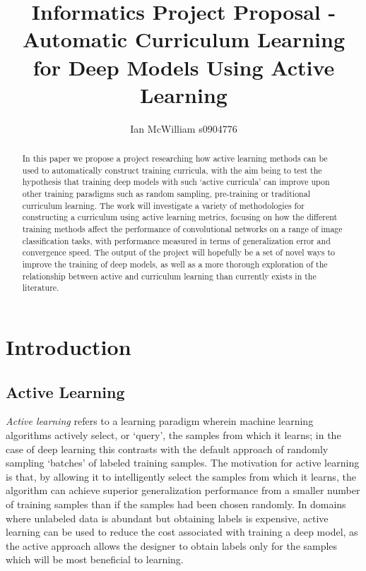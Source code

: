 \documentclass[a4paper,11pt]{article}
\begin{document}
\title{Informatics Project Proposal - Automatic Curriculum Learning for Deep Models Using Active Learning}
\author{Ian McWilliam s0904776}
\date{}
\maketitle

\begin{abstract}
In this paper we propose a project researching how active learning methods can be used to automatically construct training curricula, with the aim being to test the hypothesis that training deep models with such `active curricula' can improve upon other training paradigms such as  random sampling, pre-training or traditional curriculum learning. The work will investigate a variety of methodologies for constructing a curriculum using active learning metrics, focusing on how the different training methods affect the performance of convolutional networks on a range of image classification tasks, with performance measured in terms of generalization error and convergence speed. The output of the project will hopefully be a set of novel ways to improve the training of deep models, as well as a more thorough exploration of the relationship between active and curriculum learning than currently exists in the literature.
\end{abstract}

\section{Introduction}

\subsection{Active Learning}
\textit{Active learning} refers to a learning paradigm wherein machine learning algorithms actively select, or `query', the samples from which it learns; in the case of deep learning this contrasts with the default approach of randomly sampling `batches' of labeled training samples. The motivation for active learning is that, by allowing it to intelligently select the samples from which it learns, the algorithm can achieve superior generalization performance from a smaller number of training samples than if the samples had been chosen randomly. In domains where unlabeled data is abundant but obtaining labels is expensive, active learning can be used to reduce the cost associated with training a deep model, as the active approach allows the designer to obtain labels only for the samples which will be most beneficial to learning.
\end{document}
